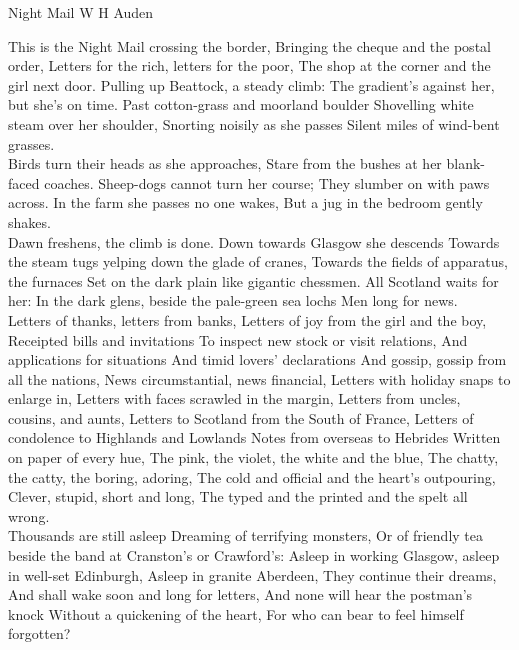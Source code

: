\begin{poem}
{Night Mail}
{W H Auden}

 This is the Night Mail crossing the border,
 Bringing the cheque and the postal order,
 Letters for the rich, letters for the poor,
 The shop at the corner and the girl next door.
 Pulling up Beattock, a steady climb:
 The gradient's against her, but she's on time.
 Past cotton-grass and moorland boulder
 Shovelling white steam over her shoulder,
 Snorting noisily as she passes
 Silent miles of wind-bent grasses.\\
 
 Birds turn their heads as she approaches,
 Stare from the bushes at her blank-faced coaches.
 Sheep-dogs cannot turn her course;
 They slumber on with paws across.
 In the farm she passes no one wakes,
 But a jug in the bedroom gently shakes.\\
 
 Dawn freshens, the climb is done.
 Down towards Glasgow she descends
 Towards the steam tugs yelping down the glade of cranes,  Towards the fields of apparatus, the furnaces  Set on the dark plain like gigantic chessmen.  All Scotland waits for her:  In the dark glens, beside the pale-green sea lochs  Men long for news.\\
 
 Letters of thanks, letters from banks,
 Letters of joy from the girl and the boy,
 Receipted bills and invitations
 To inspect new stock or visit relations,
 And applications for situations
 And timid lovers' declarations
 And gossip, gossip from all the nations,
 News circumstantial, news financial,
 Letters with holiday snaps to enlarge in,
 Letters with faces scrawled in the margin,
 Letters from uncles, cousins, and aunts,
 Letters to Scotland from the South of France,
 Letters of condolence to Highlands and Lowlands
 Notes from overseas to Hebrides
 Written on paper of every hue,
 The pink, the violet, the white and the blue,
 The chatty, the catty, the boring, adoring,
 The cold and official and the heart's outpouring,
 Clever, stupid, short and long,
 The typed and the printed and the spelt all wrong.\\
 
 Thousands are still asleep
 Dreaming of terrifying monsters,
 Or of friendly tea beside the band at Cranston's or Crawford's:  Asleep in working Glasgow, asleep in well-set Edinburgh,  Asleep in granite Aberdeen,  They continue their dreams,  And shall wake soon and long for letters,  And none will hear the postman's knock  Without a quickening of the heart,  For who can bear to feel himself forgotten?

\end{poem}


